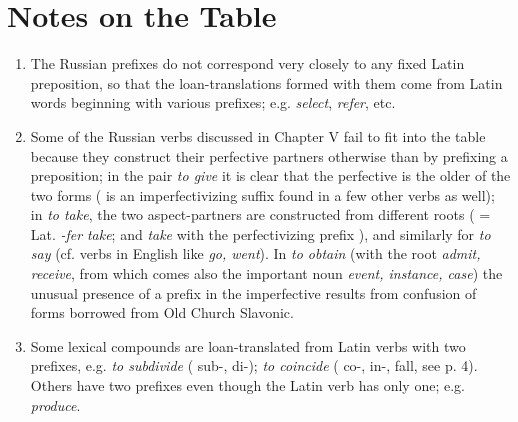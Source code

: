 \section{Notes on the Table}

\begin{enumerate}[label=\arabic*)]
\item The Russian prefixes  do not correspond very closely to any fixed Latin preposition, so that the loan-translations formed with them come from Latin words beginning with various prefixes; e.g.  \emph{select},  \emph{refer}, etc.

\item Some of the Russian verbs discussed in Chapter V fail to fit into the table because they construct their perfective partners otherwise than by prefixing a preposition; in the pair  \emph{to give} it is clear that the perfective is the older of the two forms ( is an imperfectivizing suffix found in a few other verbs as well); in  \emph{to take}, the two aspect-partners are constructed from different roots ( = Lat. \emph{-fer} \emph{take}; and  \emph{take} with the perfectivizing prefix ), and similarly for  \emph{to say} (cf. verbs in English like \emph{go, went}). In  \emph{to obtain} (with the root  \emph{admit, receive}, from which comes also the important noun  \emph{event, instance, case}) the unusual presence of a prefix in the imperfective results from confusion of forms borrowed from Old Church Slavonic.

\item Some lexical compounds are loan-translated from Latin verbs with two prefixes, e.g.  \emph{to subdivide} ( sub-,  di-);  \emph{to coincide} ( co-,  in-,  fall, see p. 4). Others have two prefixes even though the Latin verb has only one; e.g.  \emph{produce}.


\end{enumerate}
